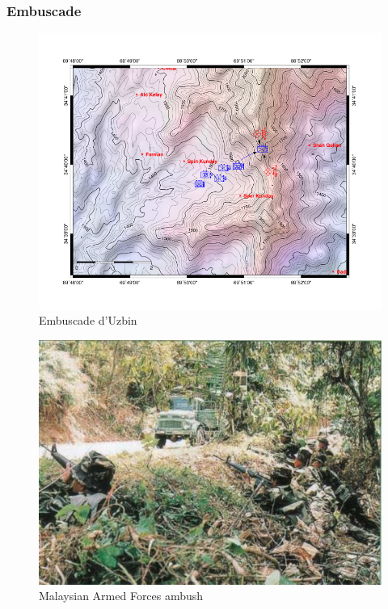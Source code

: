 \documentclass{article}
\begin{document}
\subsubsection{Embuscade}
\begin{figure}[H]
	\begin{centering}
	\includegraphics[width=\linewidth]{../ressources/Uzbin_valley_ambush-map}
	\caption{Embuscade d'Uzbin \cite{uzbin_ambush}}
	\end{centering}
\end{figure}
\begin{figure}[H]
	\begin{centering}
	\includegraphics[width=0.8\linewidth]{../ressources/ambush}
	\caption{Malaysian Armed Forces ambush \cite{ambush_picture}}
	\end{centering}
\end{figure}
\cite{ambush_wiki}
\end{document}
